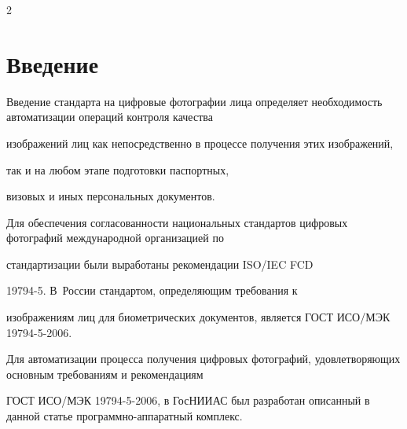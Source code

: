       \begin{multicols}{2}





      \label{st\stat}





      







\section{Введение}





Введение стандарта на цифровые фотографии лица определяет необходимость автоматизации операций контроля качества 


изображений лиц как непосредственно в процессе получения этих изоб\-ра\-же\-ний, 


так и на любом этапе подготовки паспортных, 


визовых и иных персональных доку\-ментов.


{





}





Для обеспечения согласованности национальных стандартов цифровых фотографий международной организацией по 


стандартизации были выработаны рекомендации ISO/IEC FCD


\mbox{19794-5}. В~России стандартом, определяющим требования к 


изображениям лиц для биометрических документов, является ГОСТ ИСО/МЭК 19794-5-2006.


{





}





Для автоматизации процесса получения циф\-ро\-вых фотографий, удовлетворяющих основным требованиям и рекомендациям 


ГОСТ ИСО/МЭК 19794-5-2006, в ГосНИИАС был разработан описанный в данной статье программно-аппаратный комплекс. 



\end{multicols}
